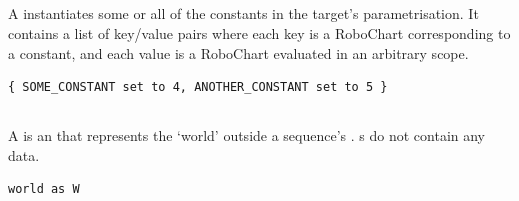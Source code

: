 \subsection{\mtargetinstantiation}

A \mtargetinstantiation{} instantiates some or all of the constants in the
target's parametrisation.  It contains a list of key/value pairs where each key
is a RoboChart \mvariable{} corresponding to a constant, and each value is a
RoboChart \mexpression{} evaluated in an arbitrary  scope.

\begin{lstlisting}[style=Example]
{ SOME_CONSTANT set to 4, ANOTHER_CONSTANT set to 5 }
\end{lstlisting}

\subsection{\mworld}\label{ssec:metamodel-actors-world}

A \mworld{} is an \mactor{} that represents the `world' outside a sequence's
\mtarget.  \mworld s do not contain any data.

\begin{lstlisting}[style=Example]
world as W
\end{lstlisting}

